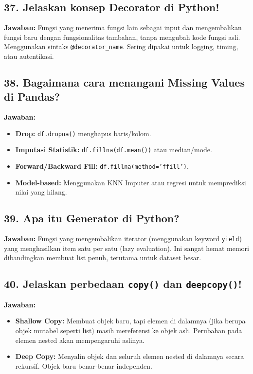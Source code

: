 \subsection{37. Jelaskan konsep Decorator di Python!}
\textbf{Jawaban:}
Fungsi yang menerima fungsi lain sebagai input dan mengembalikan fungsi baru dengan fungsionalitas tambahan, tanpa mengubah kode fungsi asli. Menggunakan sintaks \texttt{@decorator\_name}. Sering dipakai untuk logging, timing, atau autentikasi.

\subsection{38. Bagaimana cara menangani Missing Values di Pandas?}
\textbf{Jawaban:}
\begin{itemize}
    \item \textbf{Drop:} \texttt{df.dropna()} menghapus baris/kolom.
    \item \textbf{Imputasi Statistik:} \texttt{df.fillna(df.mean())} atau median/mode.
    \item \textbf{Forward/Backward Fill:} \texttt{df.fillna(method='ffill')}.
    \item \textbf{Model-based:} Menggunakan KNN Imputer atau regresi untuk memprediksi nilai yang hilang.
\end{itemize}

\subsection{39. Apa itu Generator di Python?}
\textbf{Jawaban:}
Fungsi yang mengembalikan iterator (menggunakan keyword \texttt{yield}) yang menghasilkan item satu per satu (lazy evaluation). Ini sangat hemat memori dibandingkan membuat list penuh, terutama untuk dataset besar.

\subsection{40. Jelaskan perbedaan \texttt{copy()} dan \texttt{deepcopy()}!}
\textbf{Jawaban:}
\begin{itemize}
    \item \textbf{Shallow Copy:} Membuat objek baru, tapi elemen di dalamnya (jika berupa objek mutabel seperti list) masih mereferensi ke objek asli. Perubahan pada elemen nested akan mempengaruhi aslinya.
    \item \textbf{Deep Copy:} Menyalin objek dan seluruh elemen nested di dalamnya secara rekursif. Objek baru benar-benar independen.
\end{itemize}

